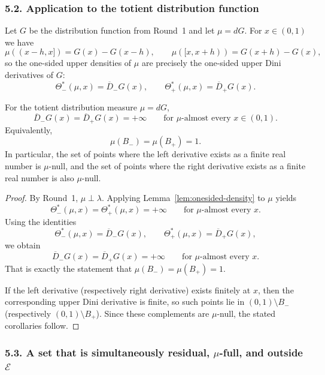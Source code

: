 \subsubsection*{5.2. Application to the totient distribution function}

Let $G$ be the distribution function from Round~1 and let $\mu=dG$.
For $x\in(0,1)$ we have
\[
\mu((x-h,x])=G(x)-G(x-h),
\qquad
\mu([x,x+h))=G(x+h)-G(x),
\]
so the one-sided upper densities of $\mu$ are precisely the one-sided upper Dini derivatives of $G$:
\[
\Theta_-^*(\mu,x)=\overline D_-G(x),
\qquad
\Theta_+^*(\mu,x)=\overline D_+G(x).
\]

\begin{theorem}\label{thm:mu-full-onesided}
For the totient distribution measure $\mu=dG$,
\[
\overline D_-G(x)=\overline D_+G(x)=+\infty
\qquad\text{for }\mu\text{-almost every }x\in(0,1).
\]
Equivalently,
\[
\mu(B_-)=\mu(B_+)=1.
\]
In particular, the set of points where the left derivative exists as a finite real number is $\mu$-null,
and the set of points where the right derivative exists as a finite real number is also $\mu$-null.
\end{theorem}

\begin{proof}
By Round~1, $\mu\perp\lambda$. Applying Lemma~\ref{lem:onesided-density} to $\mu$ yields
\[
\Theta_-^*(\mu,x)=\Theta_+^*(\mu,x)=+\infty
\qquad\text{for }\mu\text{-almost every }x.
\]
Using the identities
\[
\Theta_-^*(\mu,x)=\overline D_-G(x),
\qquad
\Theta_+^*(\mu,x)=\overline D_+G(x),
\]
we obtain
\[
\overline D_-G(x)=\overline D_+G(x)=+\infty
\qquad\text{for }\mu\text{-almost every }x.
\]
That is exactly the statement that $\mu(B_-)=\mu(B_+)=1$.

If the left derivative (respectively right derivative) exists finitely at $x$, then the corresponding upper Dini derivative is finite, so such points lie in $(0,1)\setminus B_-$ (respectively $(0,1)\setminus B_+$). Since these complements are $\mu$-null, the stated corollaries follow.
\end{proof}

\subsubsection*{5.3. A set that is simultaneously residual, $\mu$-full, and outside $\mathcal E$}

